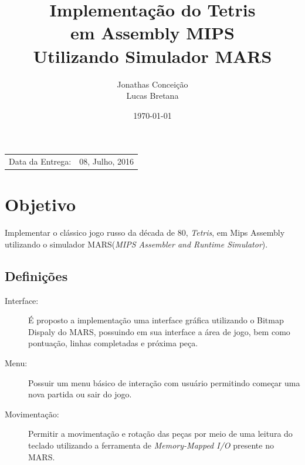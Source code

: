 \documentclass{article}
\title{Implementação do Tetris \\ em Assembly MIPS \\ Utilizando Simulador MARS} %
\author{Jonathas Conceição \\ Lucas Bretana} %
\date{\today} %
\begin{document}
\maketitle %

\begin{center}
\begin{tabular}{l r}
Data da Entrega: & 08, Julho, 2016 \\ %
\end{tabular}
\end{center}



\section{Objetivo}

Implementar o clássico jogo russo da década de 80, \textit{Tetris}, em Mips Assembly utilizando o simulador MARS(\textit{MIPS Assembler and Runtime Simulator}).




\subsection{Definições} \label{definitions}
\begin{description}
  \item[Interface:]
    É proposto a implementação uma interface gráfica utilizando o Bitmap Dispaly do MARS, possuindo em sua interface a área de jogo, bem como pontuação, linhas completadas e próxima peça.
  \item[Menu:]
    Possuir um menu básico de interação com usuário permitindo começar uma nova partida ou sair do jogo.
  \item[Movimentação:]
    Permitir a movimentação e rotação das peças por meio de uma leitura do teclado utilizando a ferramenta de \textit{Memory-Mapped I/O} presente no MARS.
\end{description}
\end{document}
